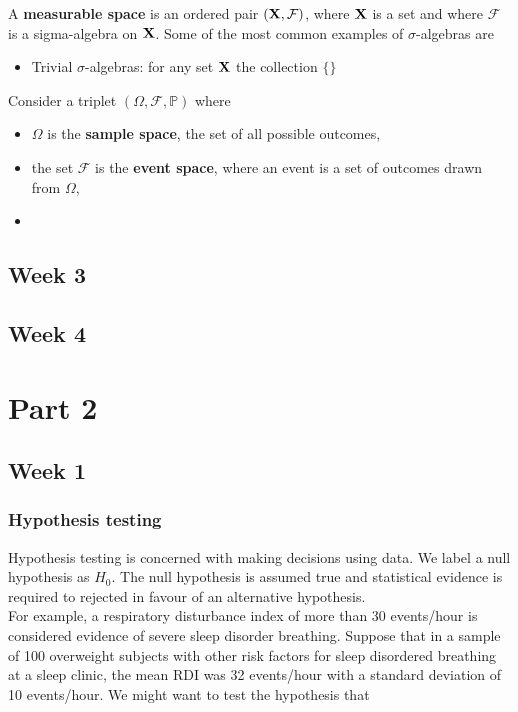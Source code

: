 \documentclass{homework}
\begin{document}
A \textbf{measurable space} is an ordered pair $({\bf X}, \mathcal{F})$, where ${\bf X}$ is a set and where $\mathcal{F}$ is a sigma-algebra on ${\bf X}$. Some of the most common examples of $\sigma$-algebras are

\begin{itemize}
    \item Trivial $\sigma$-algebras: for any set ${\bf X}$ the collection $\{\}$
\end{itemize}


Consider a triplet $(\Omega, \mathcal{F}, \mathds{P})$ where 

\begin{itemize}
    \item $\Omega$ is the \textbf{sample space}, the set of all possible outcomes, \\
    \item the set $\mathcal{F}$ is the \textbf{event space}, where an event is a set of outcomes drawn from $\Omega$,
    \item 
\end{itemize}

\subsection{Week 3}

\subsection{Week 4}

\clearpage

\section{Part 2}
\subsection{Week 1}

\subsubsection{Hypothesis testing}

Hypothesis testing is concerned with making decisions using data. We label a null hypothesis as $H_0$. The null hypothesis is assumed true and statistical evidence is required to rejected in favour of an alternative hypothesis. \\

For example, a respiratory disturbance index of more than 30 events/hour is considered evidence of severe sleep disorder breathing. Suppose that in a sample of 100 overweight subjects with other risk factors for sleep disordered breathing at a sleep clinic, the mean RDI was 32 events/hour with a standard deviation of 10 events/hour. We might want to test the hypothesis that 
\end{document}
